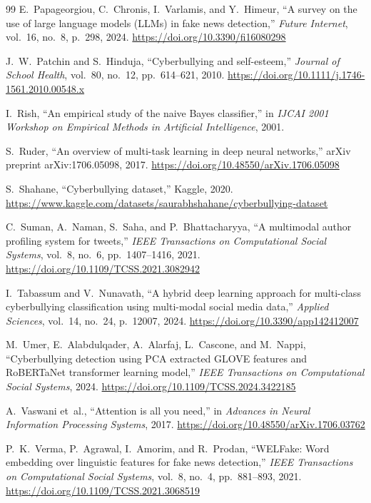 \documentclass[10pt,twocolumn,a4paper]{article}
\begin{document}
\begin{thebibliography}{99}
E.~Papageorgiou, C.~Chronis, I.~Varlamis, and Y.~Himeur, ``A survey on the use of large language models (LLMs) in fake news detection,'' \textit{Future Internet}, vol.~16, no.~8, p.~298, 2024. \url{https://doi.org/10.3390/fi16080298}

J.~W.~Patchin and S.~Hinduja, ``Cyberbullying and self-esteem,'' \textit{Journal of School Health}, vol.~80, no.~12, pp.~614--621, 2010. \url{https://doi.org/10.1111/j.1746-1561.2010.00548.x}

I.~Rish, ``An empirical study of the naive Bayes classifier,'' in \textit{IJCAI 2001 Workshop on Empirical Methods in Artificial Intelligence}, 2001.

S.~Ruder, ``An overview of multi-task learning in deep neural networks,'' arXiv preprint arXiv:1706.05098, 2017. \url{https://doi.org/10.48550/arXiv.1706.05098}

S.~Shahane, ``Cyberbullying dataset,'' Kaggle, 2020. \url{https://www.kaggle.com/datasets/saurabhshahane/cyberbullying-dataset}

C.~Suman, A.~Naman, S.~Saha, and P.~Bhattacharyya, ``A multimodal author profiling system for tweets,'' \textit{IEEE Transactions on Computational Social Systems}, vol.~8, no.~6, pp.~1407--1416, 2021. \url{https://doi.org/10.1109/TCSS.2021.3082942}

I.~Tabassum and V.~Nunavath, ``A hybrid deep learning approach for multi-class cyberbullying classification using multi-modal social media data,'' \textit{Applied Sciences}, vol.~14, no.~24, p.~12007, 2024. \url{https://doi.org/10.3390/app142412007}

M.~Umer, E.~Alabdulqader, A.~Alarfaj, L.~Cascone, and M.~Nappi, ``Cyberbullying detection using PCA extracted GLOVE features and RoBERTaNet transformer learning model,'' \textit{IEEE Transactions on Computational Social Systems}, 2024. \url{https://doi.org/10.1109/TCSS.2024.3422185}

A.~Vaswani et~al., ``Attention is all you need,'' in \textit{Advances in Neural Information Processing Systems}, 2017. \url{https://doi.org/10.48550/arXiv.1706.03762}

P.~K.~Verma, P.~Agrawal, I.~Amorim, and R.~Prodan, ``WELFake: Word embedding over linguistic features for fake news detection,'' \textit{IEEE Transactions on Computational Social Systems}, vol.~8, no.~4, pp.~881--893, 2021. \url{https://doi.org/10.1109/TCSS.2021.3068519}


\end{thebibliography}
\end{document}
